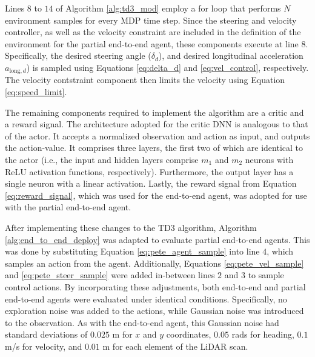 Lines $8$ to $14$ of Algorithm \ref{alg:td3_mod} employ a for loop that performs $N$ environment samples for every MDP time step.
Since the steering and velocity controller, as well as the velocity constraint are included in the definition of the environment for the partial end-to-end agent, 
these components execute at line $8$.
Specifically, the desired steering angle ($\delta_d$), and desired longitudinal acceleration $a_{\text{long},d}$) is sampled using Equations \ref{eq:delta_d} and \ref{eq:vel_control}, respectively.
The velocity contstraint component then limits the velocity using Equation \ref{eq:speed_limit}.


The remaining components required to implement the algorithm are a critic and a reward signal.
The architecture adopted for the critic DNN is analogous to that of the actor.
It accepts a normalized observation and action as input, and outputs the action-value.
It comprises three layers, the first two of which are identical to the actor (i.e., the input and hidden layers comprise $m_1$ and $m_2$ neurons with ReLU activation functions, respectively).
Furthermore, the output layer has a single neuron with a linear activation.
Lastly, the reward signal from Equation \ref{eq:reward_signal}, which was used for the end-to-end agent, was adopted for use with the partial end-to-end agent. 



After implementing these changes to the TD3 algorithm, Algorithm \ref{alg:end_to_end_deploy} was adapted to evaluate partial end-to-end agents.
This was done by substituting Equation \ref{eq:pete_agent_sample} into line $4$, which samples an action from the agent. 
Additionally, Equations \ref{eq:pete_vel_sample} and \ref{eq:pete_steer_sample} were added in-between lines $2$ and $3$ to sample control actions.
By incorporating these adjustments, both end-to-end and partial end-to-end agents were evaluated under identical conditions. 
Specifically, no exploration noise was added to the actions, while Gaussian noise was introduced to the observation.
As with the end-to-end agent, this Gaussian noise had standard deviations of $0.025$ m for $x$ and $y$ coordinates, $0.05$ rads for heading, $0.1$ m/s for velocity, and $0.01$ m for each element of the LiDAR scan. 













